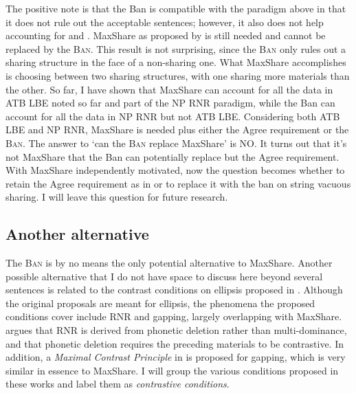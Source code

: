 \documentclass[output=paper]{langscibook}
\begin{document}
\ea
	\label{shenex34}
	\z 
\z 
The positive note is that the Ban is compatible with the paradigm above in that it does not rule out the acceptable sentences; however, it also does not help accounting for  and . MaxShare as proposed by \cite{Citko:2006} is still needed and cannot be replaced by the \textsc{Ban}. This result is not surprising, since the \textsc{Ban} only rules out a sharing structure in the face of a non-sharing one. What MaxShare accomplishes is choosing between two sharing structures, with one sharing more materials than the other. So far, I have shown that MaxShare can account for all the data in ATB LBE noted so far and part of the NP RNR paradigm, while the Ban can account for all the data in NP RNR but not ATB LBE. Considering both ATB LBE and NP RNR, MaxShare is needed plus either the Agree requirement or the \textsc{Ban}. The answer to `can the \textsc{Ban} replace MaxShare' is NO. It turns out that it's not MaxShare that the Ban can potentially replace but the Agree requirement. With MaxShare independently motivated, now the question becomes whether to retain the Agree requirement as in \cite{Shen:2018a} or to replace it with the ban on string vacuous sharing. I will leave this question for future research.

\subsection{Another alternative} 

The \textsc{Ban} is by no means the only potential alternative to MaxShare. Another possible alternative that I do not have space to discuss here beyond several sentences is related to the contrast conditions on ellipsis proposed in \cite{Hartmann:2000, Hartmann:2003, Fery:2005a}. Although the original proposals are meant for ellipsis, the phenomena the proposed conditions cover include RNR and gapping, largely overlapping with MaxShare. \cite{Hartmann:2000, Hartmann:2003} argues that RNR is derived from phonetic deletion rather than multi-dominance, and that phonetic deletion requires the preceding materials to be contrastive. In addition, a \textit{Maximal Contrast Principle} in  is proposed for gapping, which is very similar in essence to MaxShare. I will group the various conditions proposed in these works and label them as \textit{contrastive conditions}.
\end{document}
